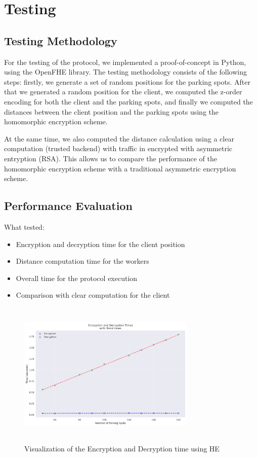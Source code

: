 \chapter{Testing}
\section{Testing Methodology}

For the testing of the protocol, we implemented a proof-of-concept in Python, using the OpenFHE library\cite{openFHE}. The testing methodology consists of the following steps: firstly, we generate a set of random positions for the parking spots. After that we generated a random position for the client, we computed the z-order encoding for both the client and the parking spots, and finally we computed the distances between the client position and the parking spots using the homomorphic encryption scheme.

At the same time, we also computed the distance calculation using a clear computation (trusted backend) with traffic in encrypted with asymmetric entryption (RSA). This allows us to compare the performance of the homomorphic encryption scheme with a traditional asymmetric encryption scheme.

\section{Performance Evaluation}

What tested:
\begin{itemize}
    \item Encryption and decryption time for the client position
    \item Distance computation time for the workers
    \item Overall time for the protocol execution
    \item Comparison with clear computation for the client
\end{itemize}

\begin{figure}[h]
    \centering
    \includegraphics[width=8.5cm,height=7cm]{img/crypto_times.png}
    \caption{Visualization of the Encryption and Decryption time using HE}
    \label{fig:testing}
\end{figure}

